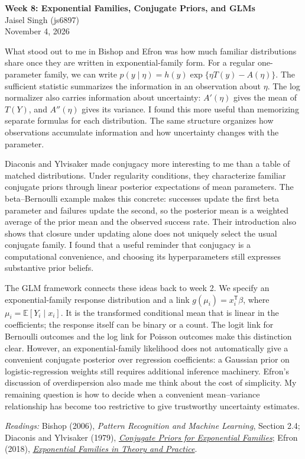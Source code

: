 \documentclass[12pt]{article}
\begin{document}
\begin{flushleft}
\textbf{Week 8: Exponential Families, Conjugate Priors, and GLMs} \\
Jaisel Singh (js6897) \\
November 4, 2026
\end{flushleft}

\vspace{0.1in}

What stood out to me in Bishop and Efron was how much familiar distributions
share once they are written in exponential-family form. For a regular
one-parameter family, we can write
\mbox{$p(y\mid\eta)=h(y)\exp\{\eta T(y)-A(\eta)\}$}.
The sufficient statistic summarizes the information in an observation about
$\eta$. The log normalizer also carries information about uncertainty:
$A'(\eta)$ gives the mean of $T(Y)$, and $A''(\eta)$ gives its variance.
I found this more useful than
memorizing separate formulas for each distribution. The same structure
organizes how observations accumulate information and how uncertainty changes
with the parameter.

Diaconis and Ylvisaker made conjugacy more interesting to me than a table of
matched distributions. Under regularity conditions, they characterize familiar
conjugate priors through linear posterior expectations of mean parameters.
The beta--Bernoulli example makes this concrete: successes update the first
beta parameter and failures update the second, so the posterior mean is a
weighted average of the prior mean and the observed success rate. Their
introduction also shows that closure under updating alone does not uniquely
select the usual conjugate family. I found that a useful reminder that
conjugacy is a computational convenience, and choosing its hyperparameters
still expresses substantive prior beliefs.

The GLM framework connects these ideas back to week 2. We specify an
exponential-family response distribution and a link
\mbox{$g(\mu_i)=x_i^{\mathsf{T}}\beta$}, where
$\mu_i=\mathbb{E}[Y_i\mid x_i]$. It is the transformed conditional mean that
is linear in the coefficients; the response itself can be binary or a count.
The logit link for Bernoulli outcomes and the log link for Poisson outcomes
make this distinction clear. However, an exponential-family likelihood does
not automatically give a convenient conjugate posterior over regression
coefficients: a Gaussian prior on logistic-regression weights still requires
additional inference machinery. Efron's discussion of overdispersion also
made me think about the cost of simplicity. My remaining question is how to
decide when a convenient mean--variance relationship has become too restrictive
to give trustworthy uncertainty estimates.

\vspace{0.05in}
{\footnotesize
\textit{Readings:} Bishop (2006), \emph{Pattern Recognition and Machine Learning}, Section 2.4;
Diaconis and Ylvisaker (1979), \href{https://www.cs.columbia.edu/~blei/fogm/readings/DiaconisYlvisaker1979.pdf}{\emph{Conjugate Priors for Exponential Families}};
Efron (2018), \href{https://www.cs.columbia.edu/~blei/fogm/readings/Efron2018.pdf}{\emph{Exponential Families in Theory and Practice}}.
\par}
\end{document}
